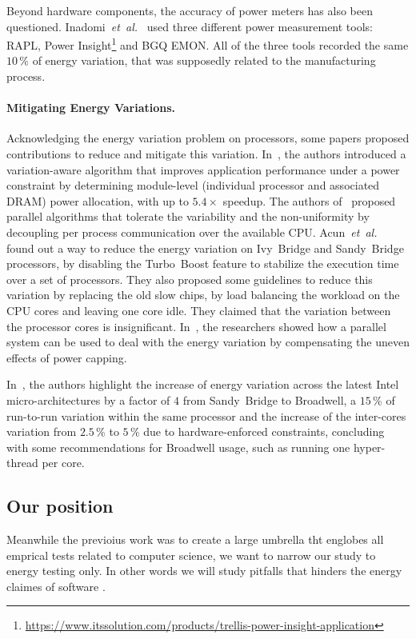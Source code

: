 Beyond hardware components, the accuracy of power meters has also been questioned.
Inadomi~\emph{et~al.}~\cite{inadomi_analyzing_2015} used three different power measurement tools: RAPL, Power Insight\footnote{\url{https://www.itssolution.com/products/trellis-power-insight-application}} and BGQ EMON.
All of the three tools recorded the same $10\,\%$ of energy variation, that was supposedly related to the manufacturing process.
\paragraph{Mitigating Energy Variations.}
Acknowledging the energy variation problem on processors, some papers proposed contributions to reduce and mitigate this variation.
In~\cite{inadomi_analyzing_2015}, the authors introduced a variation-aware algorithm that improves application performance under a power constraint by determining module-level (individual processor and associated DRAM) power allocation, with up to $5.4\times$ speedup.
The authors of~\cite{hammouda_noise-tolerant_2015} proposed parallel algorithms that tolerate the variability and the non-uniformity by decoupling per process communication over the available CPU.
Acun~\emph{et~al.}~\cite{acun_variation_2016} found out a way to reduce the energy variation on Ivy~Bridge and Sandy~Bridge processors, by disabling the Turbo~Boost feature to stabilize the execution time over a set of processors.
They also proposed some guidelines to reduce this variation by replacing the old slow chips, by load balancing the workload on the CPU cores and leaving one core idle.
They claimed that the variation between the processor cores is insignificant.
In~\cite{chasapis_runtime-guided_2016}, the researchers showed how a parallel system can be used to deal with the energy variation by compensating the uneven effects of power capping.

In~\cite{marathe_empirical_2017_m}, the authors highlight the increase of energy variation across the latest Intel micro-architectures by a factor of $4$ from Sandy~Bridge to Broadwell, a $15\,\%$ of run-to-run variation within the same processor and the increase of the inter-cores variation from $2.5\,\%$ to $5\,\%$ due to hardware-enforced constraints, concluding with some recommendations for Broadwell usage, such as running one hyper-thread per core.


\subsection*{Our position}
Meanwhile the previoius work was to create a large umbrella tht englobes all emprical tests related to computer science, we want to narrow our study to energy testing only. In other words we will study pitfalls that hinders the energy claimes of software .

